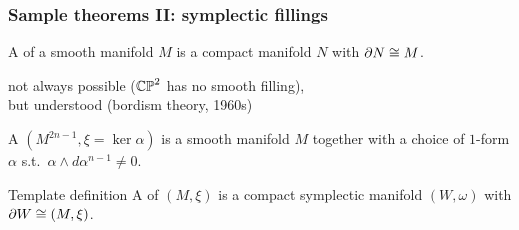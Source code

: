\begin{frame}
  \frametitle{Sample theorems II: symplectic fillings}
  \begin{definition}
    A  of a smooth manifold $M$ is a compact manifold $N$ with $\partial N\cong M$.
  \end{definition}
  not always possible ($\mathbb{CP}^{2}$ has no smooth filling),\\but understood (bordism theory, 1960s)\pause
  \begin{definition}
    A  $(M^{2n-1},\xi=\ker\alpha)$ is a smooth manifold $M$ together with a choice of $1$-form $\alpha$ s.t.\ $\alpha\wedge d\alpha^{n-1}\neq 0$.
  \end{definition}
\begin{block}{Template definition}
  A  of $(M,\xi)$ is a compact symplectic manifold $(W,\omega)$ with $\partial W\cong (M,\xi)$. %
\end{block}
\end{frame}

